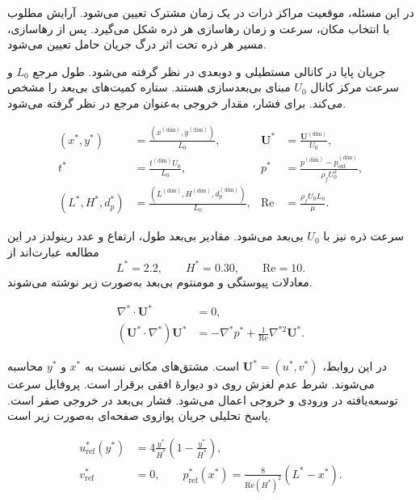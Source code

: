 \label{sec:theory-particle-formation}

در این مسئله، موقعیت مراکز ذرات در یک زمان مشترک تعیین می‌شود.
آرایش مطلوب با انتخاب مکان، سرعت و زمان رهاسازی هر ذره شکل می‌گیرد.
پس از رهاسازی، مسیر هر ذره تحت اثر درگ جریان حامل تعیین می‌شود.

\label{sec:formation-carrier-pinn}

جریان پایا در کانالی مستطیلی و دوبعدی در نظر گرفته می‌شود.
طول مرجع $L_0$ و سرعت مرکز کانال $U_0$ مبنای بی‌بعدسازی هستند.
ستاره کمیت‌های بی‌بعد را مشخص می‌کند.
برای فشار، مقدار خروجی به‌عنوان مرجع در نظر گرفته می‌شود.

\begin{equation}
\begin{aligned}
(x^*,y^*) &=
  \frac{(x^{(\mathrm{dim})},y^{(\mathrm{dim})})}{L_0},
& \mathbf U^* &= \frac{\mathbf U^{(\mathrm{dim})}}{U_0},\\
t^* &= \frac{t^{(\mathrm{dim})}U_0}{L_0},
& p^* &= \frac{p^{(\mathrm{dim})}-p_{\mathrm{out}}^{(\mathrm{dim})}}{\rho_f U_0^2},\\
(L^*,H^*,d_p^*) &=
  \frac{(L^{(\mathrm{dim})},H^{(\mathrm{dim})},d_p^{(\mathrm{dim})})}{L_0},
& \mathrm{Re} &= \frac{\rho_f U_0 L_0}{\mu}.
\end{aligned}
\label{eq:formation-nondimensionalization}
\end{equation}

سرعت ذره نیز با $U_0$ بی‌بعد می‌شود.
مقادیر بی‌بعد طول، ارتفاع و عدد رینولدز در این مطالعه عبارت‌اند از
\[
L^*=2.2,\qquad H^*=0.30,\qquad \mathrm{Re}=10.
\]
معادلات پیوستگی و مومنتوم بی‌بعد به‌صورت زیر نوشته می‌شوند.

\begin{equation}
\begin{aligned}
\nabla^*\cdot\mathbf U^* &=0,\\
(\mathbf U^*\cdot\nabla^*)\mathbf U^*
  &=-\nabla^*p^*+\frac{1}{\mathrm{Re}}\nabla^{*2}\mathbf U^*.
\end{aligned}
\label{eq:formation-flow-governing}
\end{equation}

در این روابط، $\mathbf U^*=(u^*,v^*)$ است.
مشتق‌های مکانی نسبت به $x^*$ و $y^*$ محاسبه می‌شوند.
شرط عدم لغزش روی دو دیوارهٔ افقی برقرار است.
پروفایل سرعت توسعه‌یافته در ورودی و خروجی اعمال می‌شود.
فشار بی‌بعد در خروجی صفر است.
پاسخ تحلیلی جریان پوازوی صفحه‌ای به‌صورت زیر است.

\begin{equation}
\begin{aligned}
u_{\mathrm{ref}}^*(y^*)&=
4\frac{y^*}{H^*}\left(1-\frac{y^*}{H^*}\right),\\
v_{\mathrm{ref}}^*&=0,\qquad
p_{\mathrm{ref}}^*(x^*)=
\frac{8}{\mathrm{Re}(H^*)^2}(L^*-x^*).
\end{aligned}
\label{eq:formation-poiseuille-reference}
\end{equation}


